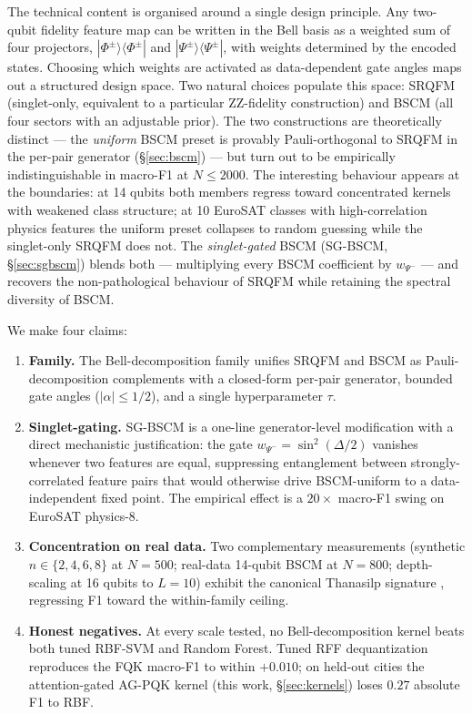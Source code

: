 \documentclass[pdflatex,sn-mathphys-num]{sn-jnl}
\theoremstyle{thmstyleone}
\theoremstyle{thmstyletwo}
\theoremstyle{thmstylethree}
\begin{document}
The technical content is organised around a single design principle. Any
two-qubit fidelity feature map can be written in the Bell basis as a
weighted sum of four projectors, $|\Phi^\pm\rangle\!\langle\Phi^\pm|$ and
$|\Psi^\pm\rangle\!\langle\Psi^\pm|$, with weights determined by the
encoded states. Choosing which weights are activated as data-dependent
gate angles maps out a structured design space. Two natural choices
populate this space: SRQFM (singlet-only, equivalent to a particular
ZZ-fidelity construction) and BSCM (all four sectors with an adjustable
prior). The two constructions are theoretically distinct --- the
\emph{uniform} BSCM preset is provably Pauli-orthogonal to SRQFM in the
per-pair generator (\S\ref{sec:bscm}) --- but turn out to be empirically
indistinguishable in macro-F1 at $N\le 2000$. The interesting
behaviour appears at the boundaries: at 14 qubits both members regress
toward concentrated kernels with weakened class structure; at 10 EuroSAT
classes with high-correlation physics features the uniform preset
collapses to random guessing while the singlet-only SRQFM does not. The
\emph{singlet-gated} BSCM (SG-BSCM, \S\ref{sec:sgbscm}) blends both ---
multiplying every BSCM coefficient by $w_{\Psi^-}$ --- and recovers the
non-pathological behaviour of SRQFM while retaining the spectral
diversity of BSCM.

We make four claims:

\begin{enumerate}
  \item \textbf{Family.} The Bell-decomposition family unifies SRQFM and
        BSCM as Pauli-decomposition complements with a closed-form
        per-pair generator, bounded gate angles ($|\alpha|\le 1/2$),
        and a single hyperparameter $\tau$.
  \item \textbf{Singlet-gating.} SG-BSCM is a one-line generator-level
        modification with a direct mechanistic justification: the gate
        $w_{\Psi^-}=\sin^2(\Delta/2)$ vanishes whenever two features are
        equal, suppressing entanglement between strongly-correlated
        feature pairs that would otherwise drive BSCM-uniform to a
        data-independent fixed point. The empirical effect is a
        $20\times$ macro-F1 swing on EuroSAT physics-8.
  \item \textbf{Concentration on real data.} Two complementary
        measurements (synthetic $n\in \{2,4,6,8\}$ at $N=500$;
        real-data 14-qubit BSCM at $N=800$; depth-scaling at 16
        qubits to $L=10$) exhibit the canonical Thanasilp signature
        \cite{thanasilp2024}, regressing F1 toward the within-family
        ceiling.
  \item \textbf{Honest negatives.} At every scale tested, no
        Bell-decomposition kernel beats both tuned RBF-SVM and Random
        Forest. Tuned RFF dequantization \cite{rahimi2007} reproduces
        the FQK macro-F1 to within $+0.010$; on held-out cities the
        attention-gated AG-PQK kernel (this work, \S\ref{sec:kernels})
        loses $0.27$ absolute F1 to RBF.
\end{enumerate}
\end{document}
